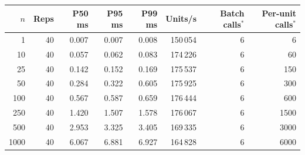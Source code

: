 \begin{tabular}{@{}rrrrrrrr@{}}
\toprule
$n$ & Reps & P50 ms & P95 ms & P99 ms & Units/s & Batch calls$^*$ & Per-unit calls$^*$ \\
\midrule
1 & 40 & 0.007 & 0.007 & 0.008 & 150\,054 & 6 & 6 \\
10 & 40 & 0.057 & 0.062 & 0.083 & 174\,226 & 6 & 60 \\
25 & 40 & 0.142 & 0.152 & 0.169 & 175\,537 & 6 & 150 \\
50 & 40 & 0.284 & 0.322 & 0.605 & 175\,925 & 6 & 300 \\
100 & 40 & 0.567 & 0.587 & 0.659 & 176\,444 & 6 & 600 \\
250 & 40 & 1.420 & 1.507 & 1.578 & 176\,067 & 6 & 1500 \\
500 & 40 & 2.953 & 3.325 & 3.405 & 169\,335 & 6 & 3000 \\
1000 & 40 & 6.067 & 6.881 & 6.927 & 164\,828 & 6 & 6000 \\
\bottomrule
\end{tabular}
